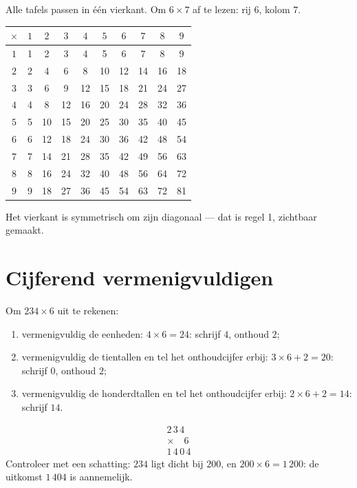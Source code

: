 \begin{example}[De tafelkaart]\label{ex:g3:mult:table}
Alle tafels passen in één vierkant. Om $6 \times 7$ af te lezen: rij
$6$, kolom $7$.
\begin{center}
\renewcommand{\arraystretch}{1.15}
\begin{tabular}{c|ccccccccc}
$\times$ & $1$ & $2$ & $3$ & $4$ & $5$ & $6$ & $7$ & $8$ & $9$ \\
\hline
$1$ & 1 & 2 & 3 & 4 & 5 & 6 & 7 & 8 & 9 \\
$2$ & 2 & 4 & 6 & 8 & 10 & 12 & 14 & 16 & 18 \\
$3$ & 3 & 6 & 9 & 12 & 15 & 18 & 21 & 24 & 27 \\
$4$ & 4 & 8 & 12 & 16 & 20 & 24 & 28 & 32 & 36 \\
$5$ & 5 & 10 & 15 & 20 & 25 & 30 & 35 & 40 & 45 \\
$6$ & 6 & 12 & 18 & 24 & 30 & 36 & 42 & 48 & 54 \\
$7$ & 7 & 14 & 21 & 28 & 35 & 42 & 49 & 56 & 63 \\
$8$ & 8 & 16 & 24 & 32 & 40 & 48 & 56 & 64 & 72 \\
$9$ & 9 & 18 & 27 & 36 & 45 & 54 & 63 & 72 & 81 \\
\end{tabular}
\end{center}
Het vierkant is symmetrisch om zijn diagonaal --- dat is regel 1,
zichtbaar gemaakt.
\end{example}

\section{Cijferend vermenigvuldigen}

\begin{method}\label{met:g3:mult:column}
Om $234 \times 6$ uit te rekenen:
\begin{enumerate}
  \item vermenigvuldig de eenheden: $4 \times 6 = 24$: schrijf $4$,
        onthoud $2$;
  \item vermenigvuldig de tientallen en tel het onthoudcijfer erbij:
        $3 \times 6 + 2 = 20$: schrijf $0$, onthoud $2$;
  \item vermenigvuldig de honderdtallen en tel het onthoudcijfer erbij:
        $2 \times 6 + 2 = 14$: schrijf $14$.
\end{enumerate}
\[
\begin{array}{r}
2\,3\,4 \\
\times \quad 6 \\
\hline
1\,4\,0\,4
\end{array}
\]
Controleer met een schatting: $234$ ligt dicht bij $200$, en
$200 \times 6 = 1\,200$: de uitkomst $1\,404$ is aannemelijk.
\end{method}

